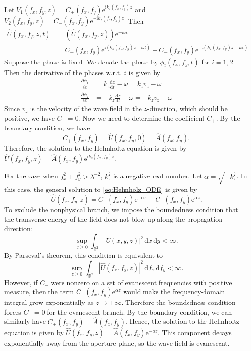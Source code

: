 \documentclass[12pt]{article}
\begin{document}
Let \(V_1(f_x, f_y, z) = C_+(f_x, f_y) \mathrm{e}^{\mathrm{i} k_z(f_x, f_y) z}\) and 
\( V_2(f_x, f_y, z) = C_-(f_x, f_y) \mathrm{e}^{-\mathrm{i} k_z(f_x, f_y) z} \). Then
\begin{align*}
    \hat{U}(f_x, f_y, z, t) &= (\hat{U}(f_x, f_y, z)) \mathrm{e}^{- \mathrm{i} \omega t} \\ &= 
    C_+(f_x, f_y) \mathrm{e}^{\mathrm{i} (k_z(f_x, f_y) z - \omega t)} + C_-(f_x, f_y) 
    \mathrm{e}^{-\mathrm{i} (k_z(f_x, f_y) z - \omega t)}
\end{align*}
Suppose the phase is fixed. We denote the phase by \( \phi_i(f_x, f_y, t) \) for \( i = 1, 2 \). Then 
the derivative of the phases w.r.t. \( t \) is given by
\begin{align*}
    \frac{\partial \phi_1}{\partial t} &= k_z \frac{\mathrm{d} z}{\mathrm{d} t} - \omega = k_z v_z - \omega \\
    \frac{\partial \phi_2}{\partial t} &= -k_z \frac{\mathrm{d} z}{\mathrm{d} t} - \omega = -k_z v_z - \omega
\end{align*}
Since \( v_z \) is the velocity of the wave field in the \( z \)-direction, which should be positive, we have
\( C_- = 0 \). Now we need to determine the coefficient \( C_+ \). By the boundary condition, we have
\[
    C_+(f_x, f_y) = \hat{U}(f_x, f_y, 0) = \hat{A}(f_x, f_y).
\]
Therefore, the solution to the Helmholtz equation is given by \( \hat{U}(f_x, f_y, z) = \hat{A}(f_x, f_y) 
\mathrm{e}^{\mathrm{i} k_z(f_x, f_y) z} \).

For the case when \( f_x^2 + f_y^2 > \lambda^{-2} \), \( k_z^2 \) is a negative real number. Let 
\( \alpha = \sqrt{-k_z^2} \). In this case, the general solution to \eqref{eq:Helmholz_ODE} is given by
\[
    \hat{U}(f_x, f_y, z) = C_+(f_x, f_y) \mathrm{e}^{-\alpha z} + 
    C_-(f_x, f_y) \mathrm{e}^{\alpha z}.
\]
To exclude the nonphysical branch, we impose the boundedness condition that the transverse energy of the
field does not blow up along the propagation direction:
\[
    \sup_{z\ge 0}\int_{\mathbb{R}^2}|U(x,y,z)|^2\,\mathrm{d}x\,\mathrm{d}y<\infty.
\]
By Parseval's theorem, this condition is equivalent to
\[
    \sup_{z\ge 0}\int_{\mathbb{R}^2}|\hat{U}(f_x,f_y,z)|^2\,\mathrm{d}f_x\,\mathrm{d}f_y<\infty.
\]
However, if \(C_-\) were nonzero on a set of evanescent frequencies with positive measure, then the term
\(C_-(f_x,f_y)\mathrm{e}^{\alpha z}\) would make the frequency-domain integral grow exponentially as
\(z\to+\infty\). Therefore the boundedness condition forces \(C_-=0\) for the evanescent branch. By the
boundary condition, we can similarly have \(C_+(f_x,f_y)=\hat{A}(f_x,f_y)\). Hence, the solution to the
Helmholtz equation is given by
\( \hat{U}(f_x,f_y,z)=\hat{A}(f_x,f_y)\mathrm{e}^{-\alpha z} \). This component decays exponentially
away from the aperture plane, so the wave field is evanescent.
\end{document}

